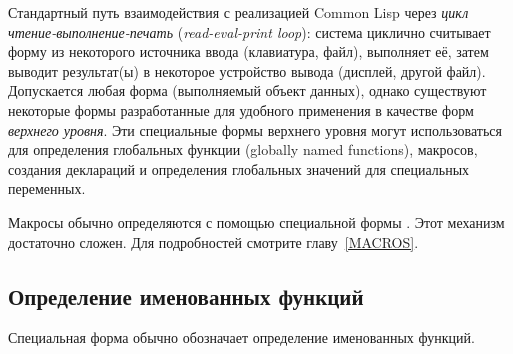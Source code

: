Стандартный путь взаимодействия с реализацией Common Lisp через
\emph{цикл чтение-выполнение-печать} (\emph{read-eval-print loop}): система
циклично считывает форму из некоторого источника ввода (клавиатура, файл),
выполняет её, затем выводит результат(ы) в некоторое устройство вывода (дисплей,
другой файл). Допускается любая форма (выполняемый объект данных), однако
существуют некоторые формы разработанные для удобного применения в качестве форм 
\emph{верхнего уровня}.
Эти специальные формы верхнего уровня могут использоваться для определения
глобальных функции (globally named functions), макросов, создания деклараций и
определения глобальных значений для специальных переменных.

Макросы обычно определяются с помощью специальной формы .
Этот механизм достаточно сложен. Для подробностей смотрите главу~\ref{MACROS}.

\subsection{Определение именованных функций}

Специальная форма  обычно обозначает определение именованных функций.

